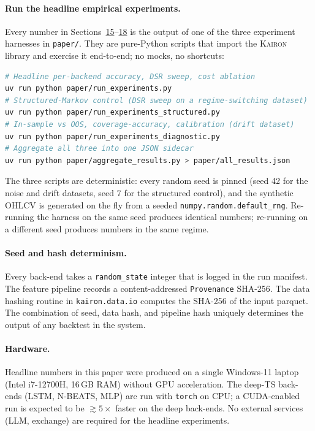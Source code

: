 \documentclass[11pt,a4paper]{article}
\providecommand{\kairon}{\textsc{Kairon}}
\begin{document}
\paragraph{Run the headline empirical experiments.}
Every number in Sections~\hyperref[sec:results]{15}--\hyperref[sec:qual]{18}
is the output of one of the three experiment harnesses
in \texttt{paper/}. They are pure-Python scripts that
import the \kairon{} library and exercise it
end-to-end; no mocks, no shortcuts:
\begin{lstlisting}[language=bash,basicstyle=\ttfamily\footnotesize,
                   backgroundcolor=\color{codebg},
                   frame=single,rulecolor=\color{codeframe}]
# Headline per-backend accuracy, DSR sweep, cost ablation
uv run python paper/run_experiments.py
# Structured-Markov control (DSR sweep on a regime-switching dataset)
uv run python paper/run_experiments_structured.py
# In-sample vs OOS, coverage-accuracy, calibration (drift dataset)
uv run python paper/run_experiments_diagnostic.py
# Aggregate all three into one JSON sidecar
uv run python paper/aggregate_results.py > paper/all_results.json
\end{lstlisting}
The three scripts are deterministic: every random
seed is pinned (seed 42 for the noise and drift
datasets, seed 7 for the structured control), and
the synthetic OHLCV is generated on the fly from a
seeded \texttt{numpy.random.default\_rng}. Re-running
the harness on the same seed produces identical
numbers; re-running on a different seed produces
numbers in the same regime.

\paragraph{Seed and hash determinism.}
Every back-end takes a \texttt{random\_state} integer that
is logged in the run manifest. The feature pipeline records
a content-addressed \texttt{Provenance} SHA-256. The data
hashing routine in \texttt{kairon.data.io} computes the
SHA-256 of the input parquet. The combination of seed,
data hash, and pipeline hash uniquely determines the
output of any backtest in the system.

\paragraph{Hardware.}
Headline numbers in this paper were produced on a single
Windows-11 laptop (Intel i7-12700H, 16\,GB RAM) without
GPU acceleration. The deep-TS back-ends (LSTM, N-BEATS,
MLP) are run with \texttt{torch} on CPU; a CUDA-enabled
run is expected to be $\gtrsim 5\times$ faster on the
deep back-ends. No external services (LLM, exchange) are
required for the headline experiments.
\end{document}
